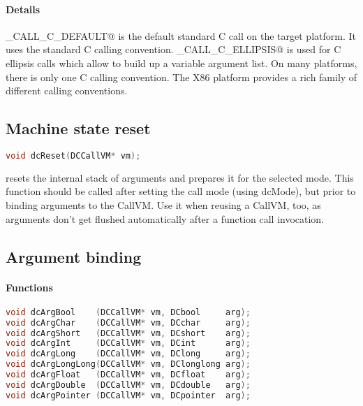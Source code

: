 \paragraph{Details}

\lstinline@DC_CALL_C_DEFAULT@ is the default standard C call on the target
platform. It uses the standard C calling convention.
\lstinline@DC_CALL_C_ELLIPSIS@ is used for C ellipsis calls which allow
to build up a variable argument list.
On many platforms, there is only one C calling convention. 
The X86 platform provides a rich family of different calling conventions.
\\

\pagebreak

\subsection{Machine state reset}

\begin{lstlisting}[language=c]
void dcReset(DCCallVM* vm);
\end{lstlisting}

resets the internal stack of arguments and prepares it for the selected mode.
This function should be called after setting the call mode (using dcMode), but
prior to binding arguments to the CallVM. Use it when reusing a CallVM, too, as
arguments don't get flushed automatically after a function call invocation.\\

\subsection{Argument binding}

\paragraph{Functions}

\begin{lstlisting}[language=c]
void dcArgBool    (DCCallVM* vm, DCbool     arg);
void dcArgChar    (DCCallVM* vm, DCchar     arg);
void dcArgShort   (DCCallVM* vm, DCshort    arg);
void dcArgInt     (DCCallVM* vm, DCint      arg);
void dcArgLong    (DCCallVM* vm, DClong     arg);
void dcArgLongLong(DCCallVM* vm, DClonglong arg);
void dcArgFloat   (DCCallVM* vm, DCfloat    arg);
void dcArgDouble  (DCCallVM* vm, DCdouble   arg);
void dcArgPointer (DCCallVM* vm, DCpointer  arg);
\end{lstlisting}

